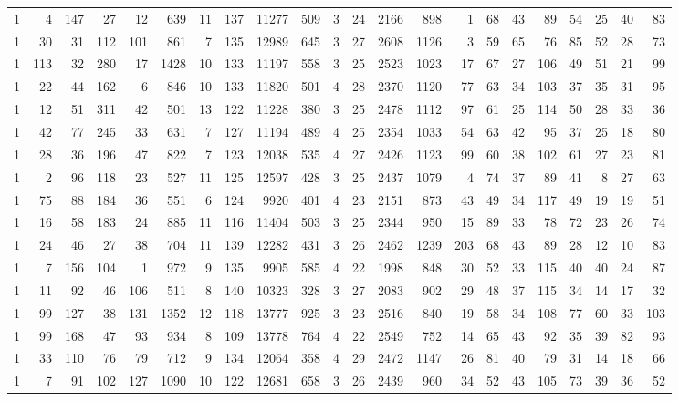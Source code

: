 {\begin{landscape}
\begin{longtable}[c]{lrrrrrrrrrrrrrrrrrrrrr}
1 & 4 & 147 & 27 & 12 & 639 & 11 & 137 & 11277 & 509 & 3 & 24 & 2166 & 898 & 1 & 68 & 43 & 89 & 54 & 25 & 40 & 83 \\
1 & 30 & 31 & 112 & 101 & 861 & 7 & 135 & 12989 & 645 & 3 & 27 & 2608 & 1126 & 3 & 59 & 65 & 76 & 85 & 52 & 28 & 73 \\
1 & 113 & 32 & 280 & 17 & 1428 & 10 & 133 & 11197 & 558 & 3 & 25 & 2523 & 1023 & 17 & 67 & 27 & 106 & 49 & 51 & 21 & 99 \\
1 & 22 & 44 & 162 & 6 & 846 & 10 & 133 & 11820 & 501 & 4 & 28 & 2370 & 1120 & 77 & 63 & 34 & 103 & 37 & 35 & 31 & 95 \\
1 & 12 & 51 & 311 & 42 & 501 & 13 & 122 & 11228 & 380 & 3 & 25 & 2478 & 1112 & 97 & 61 & 25 & 114 & 50 & 28 & 33 & 36 \\
1 & 42 & 77 & 245 & 33 & 631 & 7 & 127 & 11194 & 489 & 4 & 25 & 2354 & 1033 & 54 & 63 & 42 & 95 & 37 & 25 & 18 & 80 \\
1 & 28 & 36 & 196 & 47 & 822 & 7 & 123 & 12038 & 535 & 4 & 27 & 2426 & 1123 & 99 & 60 & 38 & 102 & 61 & 27 & 23 & 81 \\
1 & 2 & 96 & 118 & 23 & 527 & 11 & 125 & 12597 & 428 & 3 & 25 & 2437 & 1079 & 4 & 74 & 37 & 89 & 41 & 8 & 27 & 63 \\
1 & 75 & 88 & 184 & 36 & 551 & 6 & 124 & 9920 & 401 & 4 & 23 & 2151 & 873 & 43 & 49 & 34 & 117 & 49 & 19 & 19 & 51 \\
1 & 16 & 58 & 183 & 24 & 885 & 11 & 116 & 11404 & 503 & 3 & 25 & 2344 & 950 & 15 & 89 & 33 & 78 & 72 & 23 & 26 & 74 \\
1 & 24 & 46 & 27 & 38 & 704 & 11 & 139 & 12282 & 431 & 3 & 26 & 2462 & 1239 & 203 & 68 & 43 & 89 & 28 & 12 & 10 & 83 \\
1 & 7 & 156 & 104 & 1 & 972 & 9 & 135 & 9905 & 585 & 4 & 22 & 1998 & 848 & 30 & 52 & 33 & 115 & 40 & 40 & 24 & 87 \\
1 & 11 & 92 & 46 & 106 & 511 & 8 & 140 & 10323 & 328 & 3 & 27 & 2083 & 902 & 29 & 48 & 37 & 115 & 34 & 14 & 17 & 32 \\
1 & 99 & 127 & 38 & 131 & 1352 & 12 & 118 & 13777 & 925 & 3 & 23 & 2516 & 840 & 19 & 58 & 34 & 108 & 77 & 60 & 33 & 103 \\
1 & 99 & 168 & 47 & 93 & 934 & 8 & 109 & 13778 & 764 & 4 & 22 & 2549 & 752 & 14 & 65 & 43 & 92 & 35 & 39 & 82 & 93 \\
1 & 33 & 110 & 76 & 79 & 712 & 9 & 134 & 12064 & 358 & 4 & 29 & 2472 & 1147 & 26 & 81 & 40 & 79 & 31 & 14 & 18 & 66 \\
1 & 7 & 91 & 102 & 127 & 1090 & 10 & 122 & 12681 & 658 & 3 & 26 & 2439 & 960 & 34 & 52 & 43 & 105 & 73 & 39 & 36 & 52 \\

\end{longtable}
\end{landscape}}
